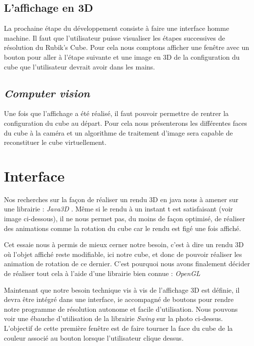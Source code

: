 \documentclass[a4paper]{report}
\begin{document}
\section{L'affichage en 3D}
La prochaine étape du développement consiste à faire une interface homme machine. Il faut que l'utilisateur puisse visualiser les étapes successives de résolution du Rubik's Cube. Pour cela nous comptons afficher une fenêtre avec un bouton pour aller à l'étape suivante et une image en 3D de la configuration du cube que l'utilisateur devrait avoir dans les mains.

\section{\textit{Computer vision}}
Une fois que l'affichage a été réalisé, il faut pouvoir permettre de rentrer la configuration du cube au départ. Pour cela nous présenterons les différentes faces du cube à la caméra et un algorithme de traitement d'image sera capable de reconstituer le cube virtuellement.

\chapter{Interface}
Nos recherches sur la façon de réaliser un rendu 3D en java nous à amener sur une librairie : \textit{Java3D} . Même si le rendu à un instant t est satisfaisant (voir image ci-dessous), il ne nous permet pas, du moins de façon optimisé, de réaliser des animations comme la rotation du cube car le rendu est figé une fois affiché.
\begin{center}
\end{center}
Cet essaie nous à permis de mieux cerner notre besoin, c'est à dire un rendu 3D où l'objet affiché reste modifiable, ici notre cube, et donc de pouvoir réaliser les animation de rotation de ce dernier. C'est pourquoi nous avons finalement décider de réaliser tout cela à l'aide d'une librairie bien connue : \textit{OpenGL}

Maintenant que notre besoin technique vis à vis de l'affichage 3D est définie, il devra être intégré dans une interface, ie accompagné de boutons pour rendre notre programme de résolution autonome et facile d'utilisation. Nous pouvons voir une ébauche d'utilisation de la librairie \textit{Swing} sur la photo ci-dessus. L'objectif de cette première fenêtre est de faire tourner la face du cube de la couleur associé au bouton lorsque l'utilisateur clique dessus.
\end{document}
